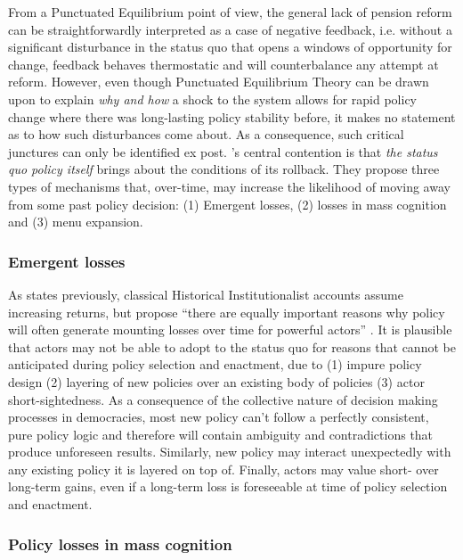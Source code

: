 \documentclass[11pt]{article}
\begin{document}
From a Punctuated Equilibrium point of view, the general lack of pension reform can be straightforwardly interpreted as a case of negative feedback, i.e. without a significant disturbance in the status quo that opens a windows of opportunity for change, feedback behaves thermostatic and will counterbalance any attempt at reform. However, even though Punctuated Equilibrium Theory can be drawn upon to explain \textit{why and how} a shock to the system allows for rapid policy change where there was long-lasting policy stability before, it makes no statement as to how such disturbances come about. As a consequence, such critical junctures can only be identified ex post. \citeauthor[][]{Jacobs2014}'s \parencite*{Jacobs2014} central contention is that \textit{the status quo policy itself} brings about the conditions of its rollback. They propose three types of mechanisms that, over-time, may increase the likelihood of moving away from some past policy decision: (1) Emergent losses, (2) losses in mass cognition and (3) menu expansion.

\subsubsection*{Emergent losses}

As states previously, classical Historical Institutionalist accounts \textcite[][]{Pierson2000} assume increasing returns, but \textcite[][]{Jacobs2014} propose \enquote{there are equally important reasons why policy will often generate mounting losses over time for powerful actors} . It is plausible that actors may not be able to adopt to the status quo for reasons that cannot be anticipated during policy selection and enactment, due to (1) impure policy design (2) layering of new policies over an existing body of policies (3) actor short-sightedness. As a consequence of the collective nature of decision making processes in democracies, most new policy can't follow a perfectly consistent, pure policy logic and therefore will contain ambiguity and contradictions that produce unforeseen results. Similarly, new policy may interact unexpectedly with any existing policy it is layered on top of. Finally, actors may value short- over long-term gains, even if a long-term loss is foreseeable at time of policy selection and enactment.

\subsubsection*{Policy losses in mass cognition}
\end{document}
